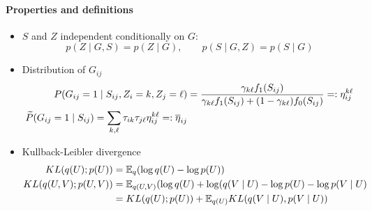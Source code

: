 \paragraph{Properties and definitions}
\begin{itemize}
 \item $S$ and $Z$ independent conditionally on $G$:
 $$
 p(Z \mid G, S) = p(Z \mid G), \qquad p(S \mid G, Z) = p(S \mid G)
 $$
 \item Distribution of $G_{ij}$
 \begin{align*}
 P(G_{ij} = 1 \mid S_{ij}, Z_i=k, Z_j=\ell) & = \frac{\gamma_{k\ell} f_1(S_{ij})}{\gamma_{k\ell} f_1(S_{ij}) + (1 - \gamma_{k\ell}) f_0(S_{ij})}  =: \eta^{k\ell}_{ij} \\
 \widetilde{P}(G_{ij} = 1 \mid S_{ij}) = \sum_{k, \ell} \tau_{ik} \tau_{j\ell} \eta^{k\ell}_{ij} =: \overline{\eta}_{ij}
 \end{align*}
 \item Kullback-Leibler divergence
 \begin{align*}
  KL(q(U) ; p(U)) 
  & = \mathbb E_q (\log q(U) - \log p(U)) \\
  KL(q(U, V) ; p(U, V)) 
  & = \mathbb E_{q(U, V)} (\log q(U) + \log(q (V \mid U) - \log p(U) - \log p(V \mid U) \\
  & = KL(q(U) ; p(U)) + \mathbb E_{q(U)} KL(q(V \mid U), p(V \mid U))
 \end{align*}
\end{itemize}
